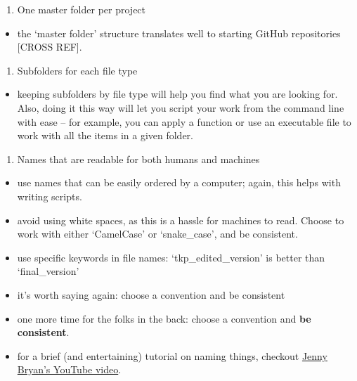 \documentclass[
]{book}
\providecommand{\tightlist}{%
  \setlength{\itemsep}{0pt}\setlength{\parskip}{0pt}}
\begin{document}
\begin{enumerate}
\def\labelenumi{\arabic{enumi}.}
\tightlist
\item
  One master folder per project
\end{enumerate}

\begin{itemize}
\tightlist
\item
  the `master folder' structure translates well to starting GitHub repositories {[}CROSS REF{]}.
\end{itemize}

\begin{enumerate}
\def\labelenumi{\arabic{enumi}.}
\setcounter{enumi}{1}
\tightlist
\item
  Subfolders for each file type
\end{enumerate}

\begin{itemize}
\tightlist
\item
  keeping subfolders by file type will help you find what you are looking for. Also, doing it this way will let you script your work from the command line with ease -- for example, you can apply a function or use an executable file to work with all the items in a given folder.
\end{itemize}

\begin{enumerate}
\def\labelenumi{\arabic{enumi}.}
\setcounter{enumi}{2}
\tightlist
\item
  Names that are readable for both humans and machines
\end{enumerate}

\begin{itemize}
\tightlist
\item
  use names that can be easily ordered by a computer; again, this helps with writing scripts.
\item
  avoid using white spaces, as this is a hassle for machines to read. Choose to work with either `CamelCase' or `snake\_case', and be consistent.
\item
  use specific keywords in file names: `tkp\_edited\_version' is better than `final\_version'
\item
  it's worth saying again: choose a convention and be consistent
\item
  one more time for the folks in the back: choose a convention and \textbf{be consistent}.
\item
  for a brief (and entertaining) tutorial on naming things, checkout \href{https://www.youtube.com/watch?v=ES1LTlnpLMk}{Jenny Bryan's YouTube video}.
\end{itemize}
\end{document}
